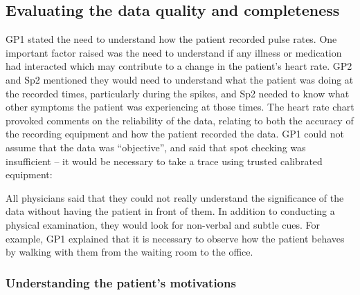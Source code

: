 \documentclass{sigchi}
\begin{document}

\subsection{Evaluating the data quality and completeness}

GP1 stated the need to understand how the patient recorded pulse rates. One important factor raised was the need to understand if any illness or medication had interacted which may contribute to a change in the patient's heart rate. GP2 and Sp2 mentioned they would need to understand what the patient was doing at the recorded times, particularly during the spikes, and Sp2 needed to know what other symptoms the patient was experiencing at those times. The heart rate chart provoked comments on the reliability of the data, relating to both the accuracy of the recording equipment and how the patient recorded the data. GP1 could not assume that the data was ``objective'', and said that spot checking was insufficient -- it would be necessary to take a trace using trusted calibrated equipment:


All physicians said that they could not really understand the significance of the data without having the patient in front of them.  In addition to conducting a physical examination, they would look for non-verbal and subtle cues.  For example, GP1 explained that it is necessary to observe how the patient behaves by walking with them from the waiting room to the office. 



\subsubsection{Understanding the patient's motivations}
\end{document}

